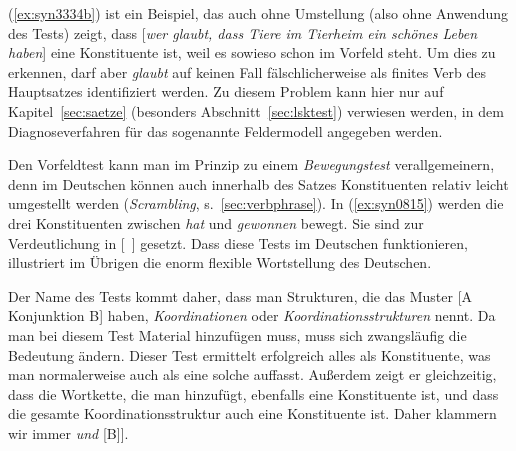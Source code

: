 (\ref{ex:syn3334b}) ist ein Beispiel, das auch ohne Umstellung (also ohne Anwendung des Tests) zeigt, dass [\textit{wer glaubt, dass Tiere im Tierheim ein schönes Leben haben}] eine Konstituente ist, weil es sowieso schon im Vorfeld steht.
Um dies zu erkennen, darf aber \textit{glaubt} auf keinen Fall fälschlicherweise als finites Verb des Hauptsatzes identifiziert werden.
Zu diesem Problem kann hier nur auf Kapitel~\ref{sec:saetze} (besonders Abschnitt~\ref{sec:lsktest}) verwiesen werden, in dem Diagnoseverfahren für das sogenannte Feldermodell angegeben werden.

Den Vorfeldtest kann man im Prinzip zu einem \textit{Bewegungstest} verallgemeinern, denn im Deutschen können auch innerhalb des Satzes Konstituenten relativ leicht umgestellt werden (\textit{Scrambling}, s.\ \ref{sec:verbphrase}).
In (\ref{ex:syn0815}) werden die drei Konstituenten zwischen \textit{hat} und \textit{gewonnen} bewegt.
Sie sind zur Verdeutlichung in [~] gesetzt.
Dass diese Tests im Deutschen funktionieren, illustriert im Übrigen die enorm flexible Wortstellung des Deutschen.

\begin{exe}
  \ex\label{ex:syn0815}
  \begin{xlist}
  \end{xlist}
\end{exe}


Der Name des Tests kommt daher, dass man Strukturen, die das Muster [A Konjunktion B] haben, \textit{Koordinationen} oder \textit{Koordinationsstrukturen} nennt.
Da man bei diesem Test Material hinzufügen muss, muss sich zwangsläufig die Bedeutung ändern.
Dieser Test ermittelt erfolgreich alles als Konstituente, was man normalerweise auch als eine solche auffasst.
Außerdem zeigt er gleichzeitig, dass die Wortkette, die man hinzufügt, ebenfalls eine Konstituente ist, und dass die gesamte Koordinationsstruktur auch eine Konstituente ist.
Daher klammern wir immer \zB [[A] \textit{und} [B]].

